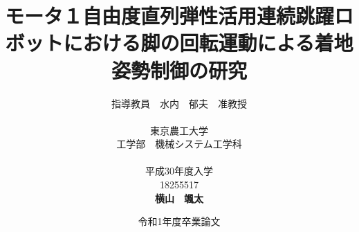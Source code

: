 


\usepackage{ikuo}%

\usepackage[dvipdfmx]{hyperref}  %
\usepackage{pxjahyper} %
\hypersetup{colorlinks=true}
\hypersetup{linkcolor=black}
\hypersetup{urlcolor=black}
\hypersetup{citecolor=black}

\usepackage{url} %

\newcommand{\FIGDIR}{./fig}        %


\date{令和1年度卒業論文}
\title{モータ１自由度直列弾性活用連続跳躍ロボットにおける脚の回転運動による着地姿勢制御の研究}
\author{指導教員　水内　郁夫　准教授 \\
\ \\
東京農工大学　\\
工学部　機械システム工学科　\\
\ \\
平成30年度入学\\
18255517\\
{\bf 横山　颯太}}


\setlength{\baselineskip}{20pt}
\maketitle
\tableofcontents

% 






% 
% 





